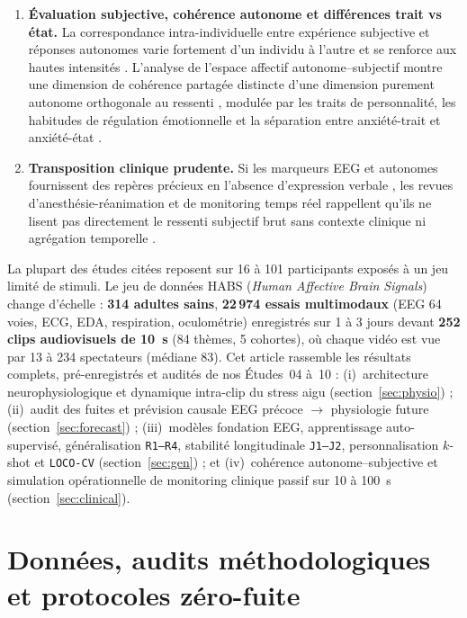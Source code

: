 \documentclass[10pt]{article}
\begin{document}
\begin{enumerate}
\item \textbf{Évaluation subjective, cohérence autonome et différences trait vs état.} La correspondance intra-individuelle entre expérience subjective et réponses autonomes varie fortement d'un individu à l'autre et se renforce aux hautes intensités \cite{brown2019,sato2020,mauss2005}. L'analyse de l'espace affectif autonome--subjectif montre une dimension de cohérence partagée distincte d'une dimension purement autonome orthogonale au ressenti \cite{cuve2023}, modulée par les traits de personnalité, les habitudes de régulation émotionnelle et la séparation entre anxiété-trait et anxiété-état \cite{nguyen2026,maxwell2018,saviola2020}.
\item \textbf{Transposition clinique prudente.} Si les marqueurs EEG et autonomes fournissent des repères précieux en l'absence d'expression verbale \cite{roue2025,adama2025}, les revues d'anesthésie-réanimation et de monitoring temps réel rappellent qu'ils ne lisent pas directement le ressenti subjectif brut sans contexte clinique ni agrégation temporelle \cite{danel2025,paniagua2025}.
\end{enumerate}

La plupart des études citées reposent sur 16 à 101 participants exposés à un jeu limité de stimuli. Le jeu de données HABS (\emph{Human Affective Brain Signals}) change d'échelle : \textbf{314 adultes sains}, \textbf{22\,974 essais multimodaux} (EEG 64 voies, ECG, EDA, respiration, oculométrie) enregistrés sur 1 à 3 jours devant \textbf{252 clips audiovisuels de 10~s} (84 thèmes, 5 cohortes), où chaque vidéo est vue par 13 à 234 spectateurs (médiane 83). Cet article rassemble les résultats complets, pré-enregistrés et audités de nos Études~04 à~10 : (i)~architecture neurophysiologique et dynamique intra-clip du stress aigu (section~\ref{sec:physio}) ; (ii)~audit des fuites et prévision causale EEG précoce $\to$ physiologie future (section~\ref{sec:forecast}) ; (iii)~modèles fondation EEG, apprentissage auto-supervisé, généralisation \texttt{R1--R4}, stabilité longitudinale \texttt{J1--J2}, personnalisation $k$-shot et \texttt{LOCO-CV} (section~\ref{sec:gen}) ; et (iv)~cohérence autonome--subjective et simulation opérationnelle de monitoring clinique passif sur 10 à 100~s (section~\ref{sec:clinical}).

\section{Données, audits méthodologiques et protocoles zéro-fuite}
\label{sec:methods}
\end{document}
